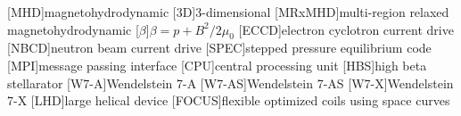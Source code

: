 \begin{acronym}
	
[MHD]{magnetohydrodynamic}
[3D]{3-dimensional}
[MRxMHD]{multi-region relaxed magnetohydrodynamic}
[$\beta$]{$\beta=p+B^2/2\mu_0$}
[ECCD]{electron cyclotron current drive}
[NBCD]{neutron beam current drive}
[SPEC]{stepped pressure equilibrium code}
[MPI]{message passing interface}
[CPU]{central processing unit}
[HBS]{high beta stellarator}
[W7-A]{Wendelstein 7-A}
[W7-AS]{Wendelstein 7-AS}
[W7-X]{Wendelstein 7-X}
[LHD]{large helical device}
[FOCUS]{flexible optimized coils using space curves}

\end{acronym}